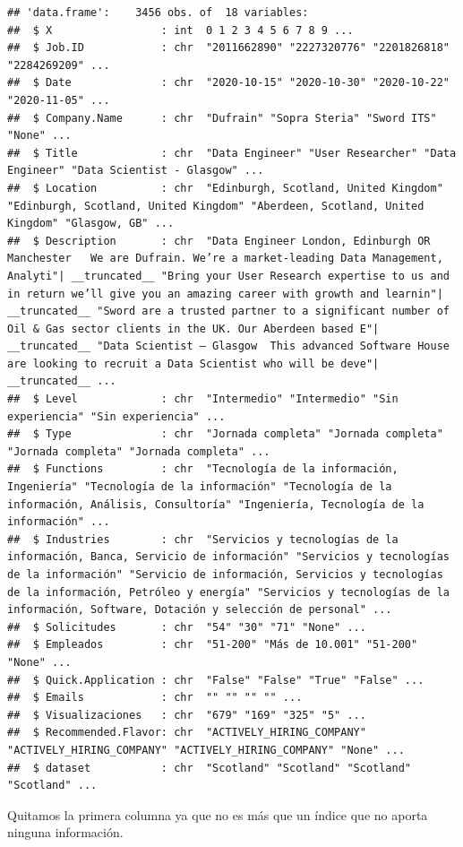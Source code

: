 \documentclass[
]{article}
\begin{document}
\begin{verbatim}
## 'data.frame':    3456 obs. of  18 variables:
##  $ X                 : int  0 1 2 3 4 5 6 7 8 9 ...
##  $ Job.ID            : chr  "2011662890" "2227320776" "2201826818" "2284269209" ...
##  $ Date              : chr  "2020-10-15" "2020-10-30" "2020-10-22" "2020-11-05" ...
##  $ Company.Name      : chr  "Dufrain" "Sopra Steria" "Sword ITS" "None" ...
##  $ Title             : chr  "Data Engineer" "User Researcher" "Data Engineer" "Data Scientist - Glasgow" ...
##  $ Location          : chr  "Edinburgh, Scotland, United Kingdom" "Edinburgh, Scotland, United Kingdom" "Aberdeen, Scotland, United Kingdom" "Glasgow, GB" ...
##  $ Description       : chr  "Data Engineer London, Edinburgh OR Manchester   We are Dufrain. We’re a market-leading Data Management, Analyti"| __truncated__ "Bring your User Research expertise to us and in return we’ll give you an amazing career with growth and learnin"| __truncated__ "Sword are a trusted partner to a significant number of Oil & Gas sector clients in the UK. Our Aberdeen based E"| __truncated__ "Data Scientist – Glasgow  This advanced Software House are looking to recruit a Data Scientist who will be deve"| __truncated__ ...
##  $ Level             : chr  "Intermedio" "Intermedio" "Sin experiencia" "Sin experiencia" ...
##  $ Type              : chr  "Jornada completa" "Jornada completa" "Jornada completa" "Jornada completa" ...
##  $ Functions         : chr  "Tecnología de la información, Ingeniería" "Tecnología de la información" "Tecnología de la información, Análisis, Consultoría" "Ingeniería, Tecnología de la información" ...
##  $ Industries        : chr  "Servicios y tecnologías de la información, Banca, Servicio de información" "Servicios y tecnologías de la información" "Servicio de información, Servicios y tecnologías de la información, Petróleo y energía" "Servicios y tecnologías de la información, Software, Dotación y selección de personal" ...
##  $ Solicitudes       : chr  "54" "30" "71" "None" ...
##  $ Empleados         : chr  "51-200" "Más de 10.001" "51-200" "None" ...
##  $ Quick.Application : chr  "False" "False" "True" "False" ...
##  $ Emails            : chr  "" "" "" "" ...
##  $ Visualizaciones   : chr  "679" "169" "325" "5" ...
##  $ Recommended.Flavor: chr  "ACTIVELY_HIRING_COMPANY" "ACTIVELY_HIRING_COMPANY" "ACTIVELY_HIRING_COMPANY" "None" ...
##  $ dataset           : chr  "Scotland" "Scotland" "Scotland" "Scotland" ...
\end{verbatim}

Quitamos la primera columna ya que no es más que un índice que no aporta
ninguna información.
\end{document}
